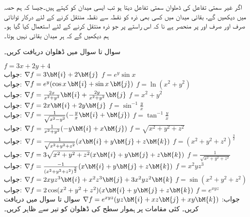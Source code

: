 اگر غیر سمتی تفاعل کی ڈھلوان سمتی تفاعل دیتا ہو تب ایسی میدان کو  کہتے ہیں۔جیسا کہ ہم  حصہ  میں دیکھیں گے، بقائی میدان میں کسی بھی ذرہ کو نقطہ  سے نقطہ  منتقل کرنے کے لئے درکار توانائی صرف اور صرف  اور  پر منحصر ہے نا کہ اس راستے پر جو ذرہ منتقل کرنے کے لئے استعمال کیا گیا ہو۔ہم دیکھیں گے کہ ہر میدان بقائی نہیں ہوتا۔

سوال  تا سوال  میں ڈھلوان  دریافت کریں۔ 

\quad 
$f=3x+2y+4$\\
جواب:\quad
$\nabla f=3\bM{i}+2\bM{j}$
\quad 
$f=e^y\sin x$\\
جواب:\quad
$\nabla f=e^y(\cos x\,\bM{i}+\sin x\,\bM{j})$
\quad 
$f=\ln(x^2+y^2)$\\
جواب:\quad
$\nabla f=\frac{2x}{x^2+y^2}\bM{i}+\frac{2y}{x^2+y^2}\bM{j}$
\quad 
$f=x^2+y^2$\\
جواب:\quad
$\nabla f=2x\bM{i}+2y\bM{j}$
\quad 
$f=\sin^{-1}\frac{y}{x}$\\
جواب:\quad
$\nabla f=\frac{1}{\sqrt{x^2-y^2}}(-\frac{y}{x}\bM{i}+\bM{j})$
\quad 
$f=\tan^{-1}\frac{y}{x}$\\
جواب:\quad
$\nabla f=\frac{1}{x^2+y^2}(-y\bM{i}+x\bM{j})$
\quad 
$f=\sqrt{x^2+y^2+z^2}$\\
جواب:\quad
$\nabla f=\frac{1}{\sqrt{x^2+y^2+z^2}}(x\bM{i}+y\bM{j}+z\bM{k})$
\quad 
$f=(x^2+y^2+z^2)^{\frac{3}{2}}$\\
جواب:\quad
$\nabla f=3\sqrt{x^2+y^2+z^2}(x\bM{i}+y\bM{j}+z\bM{k})$
\quad 
$f=\frac{1}{\sqrt{x^2+y^2+z^2}}$\\
جواب:\quad
$\nabla f=\frac{-1}{(x^2+y^2+z^2)^{\frac{3}{2}}}(x\bM{i}+y\bM{j}+z\bM{k})$
\quad 
$f=x^2yz^3$\\
جواب:\quad
$\nabla f=2xyz^3\bM{i}+x^2z^3\bM{j}+3x^2yz^2\bM{k}$
\quad 
$f=\sin(x^2+y^2+z^2)$\\
جواب:\quad
$\nabla f=2\cos(x^2+y^2+z^2)(x\bM{i}+y\bM{j}+z\bM{k})$
\quad 
$f=e^{xyz}$\\
جواب:\quad
$\nabla f=e^{xyz}(yz\bM{i}+xz\bM{j}+xy\bM{k})$
سوال  تا سوال  میں  دریافت کریں۔ کئی مقامات پر ہموار سطح  کی ڈھلوان  کو تیر سے ظاہر کریں۔ 

